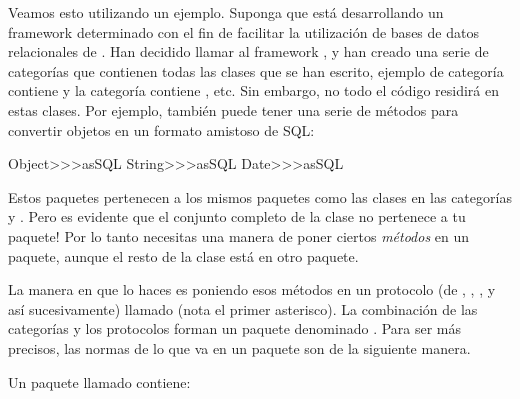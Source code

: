 \documentclass[spanish,a4paper,10pt,twoside]{book}
\begin{document}
Veamos esto utilizando un ejemplo.
Suponga que est\'a desarrollando un framework determinado con el fin de facilitar la utilizaci\'on de bases de datos relacionales de \pharo. Han decidido llamar al framework , y han creado una serie de categor\'ias que contienen todas las clases que se han escrito, ejemplo de categor\'ia  contiene  y la categor\'ia  contiene , etc. Sin embargo, no todo el c\'odigo residir\'a en estas clases. Por ejemplo, tambi\'en puede tener una serie de m\'etodos para convertir objetos en un formato amistoso de SQL:

\begin{code}{}
Object>>>asSQL
String>>>asSQL
Date>>>asSQL
\end{code}

\noindent
Estos paquetes pertenecen a
los mismos paquetes como las clases en las
categor\'ias  y .
Pero es evidente que el conjunto completo de la clase  no pertenece a tu paquete!
Por lo tanto necesitas una manera de poner ciertos \emph{m\'etodos} en un paquete, aunque el resto de la clase est\'a en otro paquete.

La manera en que lo haces es poniendo esos m\'etodos en un protocolo  (de , , , y as\'i sucesivamente) llamado  (nota el primer asterisco). La combinaci\'on de las categor\'ias  y los protocolos  forman un paquete denominado .
Para ser m\'as precisos, las normas de lo que va en un paquete son de la siguiente manera.

Un paquete llamado  contiene:
\end{document}
